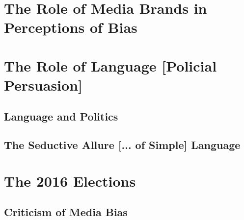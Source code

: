   

\section{The Role of Media Brands in Perceptions of Bias}


 









\section{The Role of Language [Policial Persuasion]}




\subsection{Language and Politics}
\subsection{The Seductive Allure [... of Simple] Language}



 

\section{The 2016 Elections} 
\subsection{Criticism of Media Bias} 









